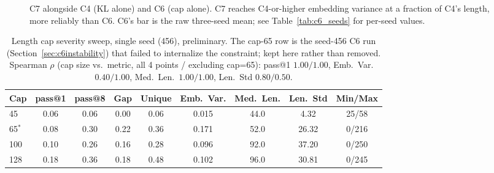\documentclass{article}
\begin{document}
\begin{figure}[h]
\centering
{}
\hfill
{}
\caption{C7 alongside C4 (KL alone) and C6 (cap alone). C7 reaches C4-or-higher embedding variance at a fraction of C4's length, more reliably than C6. C6's bar is the raw three-seed mean; see Table~\ref{tab:c6_seeds} for per-seed values.}
\label{fig:c7_comparison}
\end{figure}

\begin{table}[h]
\centering
\caption{Length cap severity sweep, single seed (456), preliminary. The cap-65 row is the seed-456 C6 run (Section~\ref{sec:c6instability}) that failed to internalize the constraint; kept here rather than removed. Spearman $\rho$ (cap size vs.\ metric, all 4 points / excluding cap=65): pass@1 $1.00/1.00$, Emb.\ Var.\ $0.40/1.00$, Med.\ Len.\ $1.00/1.00$, Len.\ Std $0.80/0.50$.}
\label{tab:sweep}
\small
\begin{tabular}{lcccccccc}
\toprule
\textbf{Cap} & \textbf{pass@1} & \textbf{pass@8} & \textbf{Gap} & \textbf{Unique} & \textbf{Emb.\ Var.} & \textbf{Med.\ Len.} & \textbf{Len.\ Std} & \textbf{Min/Max} \\
\midrule
45  & 0.06 & 0.06 & 0.00 & 0.06 & 0.015 & 44.0 & 4.32 & 25/58 \\
65$^*$ & 0.08 & 0.30 & 0.22 & 0.36 & 0.171 & 52.0 & 26.32 & 0/216 \\
100 & 0.10 & 0.26 & 0.16 & 0.28 & 0.096 & 92.0 & 37.20 & 0/250 \\
128 & 0.18 & 0.36 & 0.18 & 0.48 & 0.102 & 96.0 & 30.81 & 0/245 \\
\bottomrule
\end{tabular}
\end{table}
\end{document}
